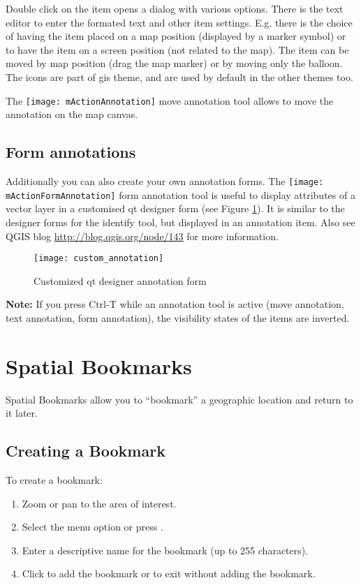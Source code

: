 Double click on the item opens a dialog with various options. There is the
text editor to enter the formated text and other item settings. E.g. there
is the choice of having the item placed on a map position (displayed by
a marker symbol) or to have the item on a screen position (not related
to the map). The item can be moved by map position (drag the map marker)
or by moving only the balloon. The icons are part of gis theme, and are used
by default in the other themes too.

The \texttt{[image: mActionAnnotation]} move annotation
tool allows to move the annotation on the map canvas.

\subsection{Form annotations}

Additionally you can also create your own annotation forms. The
\texttt{[image: mActionFormAnnotation]} form annotation
tool is useful to display attributes of a vector layer in a customised qt
designer form (see Figure \ref{fig:custom-annotations}). It is similar to the
designer forms for the identify tool, but displayed in an annotation item.
Also see QGIS blog \url{http://blog.qgis.org/node/143} for more information.

\begin{figure}[ht]
   \centering
   \texttt{[image: custom\_annotation]}
   \caption{Customized qt designer annotation form \nixcaption}
   \label{fig:custom-annotations}
\end{figure}

\textbf{Note:} If you press Ctrl-T while an annotation tool is active 
(move annotation, text annotation, form annotation), the visibility states 
of the items are inverted.

\newpage

\section{Spatial Bookmarks}\label{sec:bookmarks}

Spatial Bookmarks allow you to ``bookmark'' a geographic location and return to it later.

\subsection{Creating a Bookmark}
To create a bookmark:
\begin{enumerate}
\item Zoom or pan to the area of interest.
\item Select the menu option  \arrow {} or press .
\item Enter a descriptive name for the bookmark (up to 255 characters).
\item Click  to add the bookmark or  to exit without adding the bookmark.
\end{enumerate}

